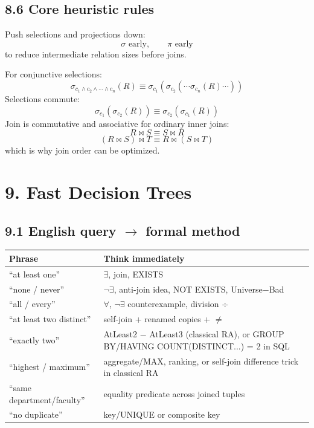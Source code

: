 \documentclass[10pt,a4paper]{article}
\begin{document}
\subsection{8.6 Core heuristic rules}
Push selections and projections down:
\[
\sigma\text{ early},\qquad \pi\text{ early}
\]
to reduce intermediate relation sizes before joins.

For conjunctive selections:
\[
\sigma_{c_1\land c_2\land\cdots\land c_n}(R)
\equiv
\sigma_{c_1}(\sigma_{c_2}(\cdots\sigma_{c_n}(R)\cdots))
\]
Selections commute:
\[
\sigma_{c_1}(\sigma_{c_2}(R))\equiv \sigma_{c_2}(\sigma_{c_1}(R))
\]
Join is commutative and associative for ordinary inner joins:
\[
R\bowtie S\equiv S\bowtie R
\]
\[
(R\bowtie S)\bowtie T\equiv R\bowtie(S\bowtie T)
\]
which is why join order can be optimized.

\section{9. Fast Decision Trees}

\subsection{9.1 English query $\to$ formal method}
\begin{center}
\begin{tabularx}{\textwidth}{p{4cm} X}
\toprule
\textbf{Phrase} & \textbf{Think immediately}\\
\midrule
``at least one'' & $\exists$, join, EXISTS\\
``none / never'' & $\neg\exists$, anti-join idea, NOT EXISTS, Universe$-$Bad\\
``all / every'' & $\forall$, $\neg\exists$ counterexample, division $\div$\\
``at least two distinct'' & self-join + renamed copies + $\neq$\\
``exactly two'' & AtLeast2 $-$ AtLeast3 (classical RA), or GROUP BY/HAVING COUNT(DISTINCT...) = 2 in SQL\\
``highest / maximum'' & aggregate/MAX, ranking, or self-join difference trick in classical RA\\
``same department/faculty'' & equality predicate across joined tuples\\
``no duplicate'' & key/UNIQUE or composite key\\
\bottomrule
\end{tabularx}
\end{center}
\end{document}
